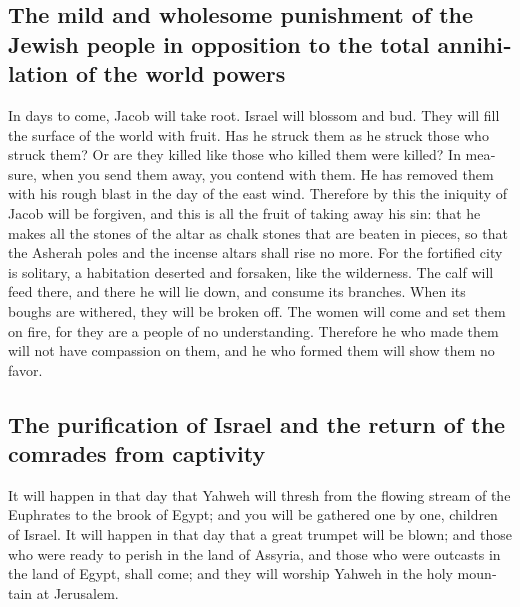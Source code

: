 \begin{paracol}{2}
\begin{otherlanguage}{english}
\hypertarget{the-mild-and-wholesome-punishment-of-the-jewish-people-in-opposition-to-the-total-annihilation-of-the-world-powers}{%
\subsection{The mild and wholesome punishment of the Jewish people in
opposition to the total annihilation of the world
powers}\label{the-mild-and-wholesome-punishment-of-the-jewish-people-in-opposition-to-the-total-annihilation-of-the-world-powers}}

 In days to come, Jacob will take root. Israel will
blossom and bud. They will fill the surface of the world with fruit.
 Has he struck them as he struck those who struck them? Or
are they killed like those who killed them were killed? 
In measure, when you send them away, you contend with them. He has
removed them with his rough blast in the day of the east wind.
 Therefore by this the iniquity of Jacob will be forgiven,
and this is all the fruit of taking away his sin: that he makes all the
stones of the altar as chalk stones that are beaten in pieces, so that
the Asherah poles and the incense altars shall rise no more.
 For the fortified city is solitary, a habitation
deserted and forsaken, like the wilderness. The calf will feed there,
and there he will lie down, and consume its branches. 
When its boughs are withered, they will be broken off. The women will
come and set them on fire, for they are a people of no understanding.
Therefore he who made them will not have compassion on them, and he who
formed them will show them no favor.

\hypertarget{the-purification-of-israel-and-the-return-of-the-comrades-from-captivity}{%
\subsection{The purification of Israel and the return of the comrades
from
captivity}\label{the-purification-of-israel-and-the-return-of-the-comrades-from-captivity}}

 It will happen in that day that Yahweh will thresh from
the flowing stream of the Euphrates to the brook of Egypt; and you will
be gathered one by one, children of Israel.  It will
happen in that day that a great trumpet will be blown; and those who
were ready to perish in the land of Assyria, and those who were outcasts
in the land of Egypt, shall come; and they will worship Yahweh in the
holy mountain at Jerusalem.


\end{otherlanguage}
\end{paracol}
